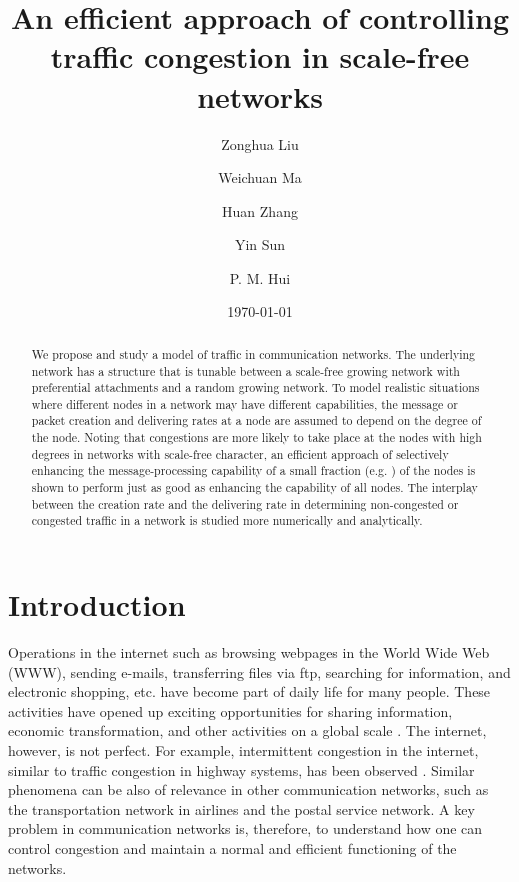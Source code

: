 \documentclass[aps,prl,twocolumn,superscriptaddress,showpacs]{revtex4}
\begin{document}
\title{An efficient approach of controlling traffic congestion in scale-free networks}

\author{Zonghua Liu}
\author{Weichuan Ma}
\author{Huan Zhang}
\author{Yin Sun}
\author{P. M. Hui}

\date{\today}

\begin{abstract}
We propose and study a model of traffic in communication networks.
The underlying network has a structure that is tunable between a
scale-free growing network with preferential attachments and a
random growing network.  To model realistic situations where
different nodes in a network may have different capabilities, the
message or packet creation and delivering rates at a node are
assumed to depend on the degree of the node.  Noting that
congestions are more likely to take place at the nodes with high
degrees in networks with scale-free character, an efficient
approach of selectively enhancing the message-processing
capability of a small fraction (e.g. ) of the nodes is shown
to perform just as good as enhancing the capability of all nodes.
The interplay between the creation rate and the delivering rate in
determining non-congested or congested traffic in a network is
studied more numerically and analytically.

\end{abstract}
 \maketitle

\section{Introduction}
Operations in the internet such as browsing webpages in the World
Wide Web (WWW), sending e-mails, transferring files via ftp,
searching for information, and electronic shopping, etc. have
become part of daily life for many people. These activities have
opened up exciting opportunities for sharing information, economic
transformation, and other activities on a global scale
\cite{Rad:1992,Rad:1993}. The internet, however, is not perfect.
For example, intermittent congestion in the internet, similar to
traffic congestion in highway systems, has been observed
\cite{Huber:1997}.  Similar phenomena can be also of relevance in
other communication networks, such as the transportation network
in airlines and the postal service network. A key problem in
communication networks is, therefore, to understand how one can
control congestion and maintain a normal and efficient functioning
of the networks.
\end{document}
